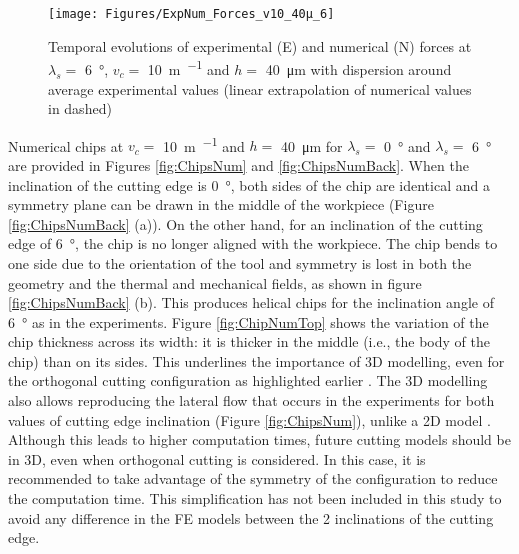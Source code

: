 \documentclass[preprint,12pt,times]{elsarticle}
\begin{document}
\begin{figure}[!h]
\centering
\texttt{[image: Figures/ExpNum\_Forces\_v10\_40µ\_6]}
\caption{Temporal evolutions of experimental (E) and numerical (N) forces at $\lambda_s =$ \qty{6}{\degree}, $v_c =$ \qty{10}{\m\per\min} and $h =$ \qty{40}{\um} with dispersion around average experimental values (linear extrapolation of numerical values in dashed)}
\label{fig:ExpNum_Forces_v10_40µ_6}
\end{figure}

Numerical chips at $v_c =$ \qty{10}{\m\per\min} and $h =$ \qty{40}{\um} for $\lambda_s =$ \qty{0}{\degree} and $\lambda_s =$ \qty{6}{\degree} are provided in Figures \ref{fig:ChipsNum} and \ref{fig:ChipsNumBack}. When the inclination of the cutting edge is \qty{0}{\degree}, both sides of the chip are identical and a symmetry plane can be drawn in the middle of the workpiece (Figure \ref{fig:ChipsNumBack} (a)). On the other hand, for an inclination of the cutting edge of \qty{6}{\degree}, the chip is no longer aligned with the workpiece. The chip bends to one side due to the orientation of the tool and symmetry is lost in both the geometry and the thermal and mechanical fields, as shown in figure \ref{fig:ChipsNumBack} (b). This produces helical chips for the inclination angle of \qty{6}{\degree} as in the experiments. Figure \ref{fig:ChipNumTop} shows the variation of the chip thickness across its width: it is thicker in the middle (i.e., the body of the chip) than on its sides. This underlines the importance of 3D modelling, even for the orthogonal cutting configuration as highlighted earlier \cite{ducobu_Finite_2017}. The 3D modelling also allows reproducing the lateral flow that occurs in the experiments for both values of cutting edge inclination (Figure \ref{fig:ChipsNum}), unlike a 2D model \cite{xu_Simulation_2021, ambrosio_New_2022, ducobu_Finite_2017}. Although this leads to higher computation times, future cutting models should be in 3D, even when orthogonal cutting is considered. In this case, it is recommended to take advantage of the symmetry of the configuration to reduce the computation time. This simplification has not been included in this study to avoid any difference in the FE models between the 2 inclinations of the cutting edge.
\end{document}
